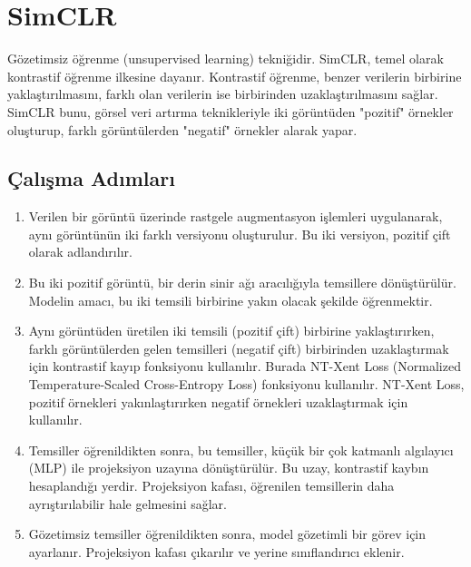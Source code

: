 \section{SimCLR}

Gözetimsiz öğrenme (unsupervised learning) tekniğidir. SimCLR, temel olarak kontrastif öğrenme ilkesine dayanır. Kontrastif öğrenme, benzer verilerin birbirine yaklaştırılmasını, farklı olan verilerin ise birbirinden uzaklaştırılmasını sağlar. SimCLR bunu, görsel veri artırma teknikleriyle iki görüntüden "pozitif" örnekler oluşturup, farklı görüntülerden "negatif" örnekler alarak yapar. 

\subsection{Çalışma Adımları}

\begin{enumerate}
    \item Verilen bir görüntü üzerinde rastgele augmentasyon işlemleri uygulanarak, aynı görüntünün iki farklı versiyonu oluşturulur. Bu iki versiyon, pozitif çift olarak adlandırılır.
    \item Bu iki pozitif görüntü, bir derin sinir ağı aracılığıyla temsillere dönüştürülür. Modelin amacı, bu iki temsili birbirine yakın olacak şekilde öğrenmektir.
    \item Aynı görüntüden üretilen iki temsili (pozitif çift) birbirine yaklaştırırken, farklı görüntülerden gelen temsilleri (negatif çift) birbirinden uzaklaştırmak için kontrastif kayıp fonksiyonu kullanılır. Burada NT-Xent Loss (Normalized Temperature-Scaled Cross-Entropy Loss) fonksiyonu kullanılır. NT-Xent Loss, pozitif örnekleri yakınlaştırırken negatif örnekleri uzaklaştırmak için kullanılır.
    \item Temsiller öğrenildikten sonra, bu temsiller, küçük bir çok katmanlı algılayıcı (MLP) ile projeksiyon uzayına dönüştürülür. Bu uzay, kontrastif kaybın hesaplandığı yerdir. Projeksiyon kafası, öğrenilen temsillerin daha ayrıştırılabilir hale gelmesini sağlar.
    \item Gözetimsiz temsiller öğrenildikten sonra, model gözetimli bir görev için ayarlanır. Projeksiyon kafası çıkarılır ve yerine sınıflandırıcı eklenir.
\end{enumerate}

\newpage